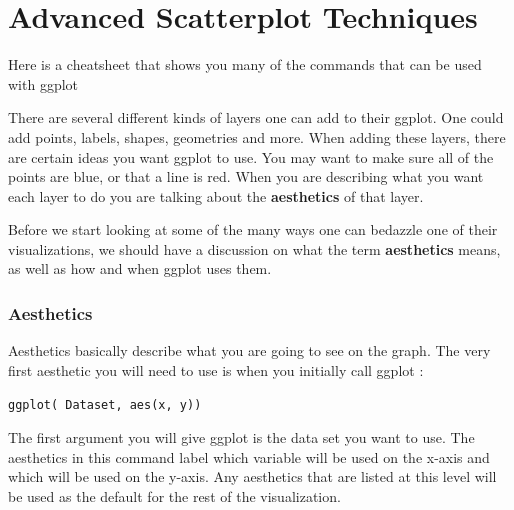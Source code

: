\documentclass[
  letterpaper,
  DIV=11,
  numbers=noendperiod]{scrreprt}
\begin{document}
\chapter*{Advanced Scatterplot
Techniques}\label{advanced-scatterplot-techniques}


\begin{tcolorbox}[enhanced jigsaw, toprule=.15mm, colbacktitle=quarto-callout-tip-color!10!white, titlerule=0mm, arc=.35mm, breakable, opacityback=0, coltitle=black, opacitybacktitle=0.6, title=\textcolor{quarto-callout-tip-color}{\faLightbulb}\hspace{0.5em}{ggplot cheatsheet}, left=2mm, bottomtitle=1mm, colback=white, rightrule=.15mm, colframe=quarto-callout-tip-color-frame, bottomrule=.15mm, toptitle=1mm, leftrule=.75mm]

Here is a cheatsheet that shows you many of the commands that can be
used with ggplot

\end{tcolorbox}

There are several different kinds of layers one can add to their ggplot.
One could add points, labels, shapes, geometries and more. When adding
these layers, there are certain ideas you want ggplot to use. You may
want to make sure all of the points are blue, or that a line is red.
When you are describing what you want each layer to do you are talking
about the \textbf{aesthetics} of that layer.

Before we start looking at some of the many ways one can bedazzle one of
their visualizations, we should have a discussion on what the term
\textbf{aesthetics} means, as well as how and when ggplot uses them.

\subsection*{Aesthetics}\label{aesthetics}

Aesthetics basically describe what you are going to see on the graph.
The very first aesthetic you will need to use is when you initially call
ggplot :

\texttt{ggplot(\ Dataset,\ aes(x,\ y))}

The first argument you will give ggplot is the data set you want to use.
The aesthetics in this command label which variable will be used on the
x-axis and which will be used on the y-axis. Any aesthetics that are
listed at this level will be used as the default for the rest of the
visualization.
\end{document}
